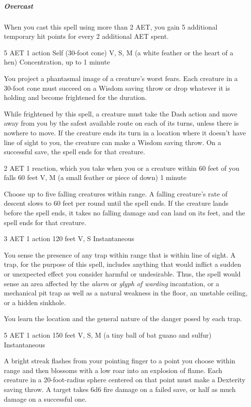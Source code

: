 \subparagraph*{Overcast} When you cast this spell using more than 2 AET, you gain 5 additional temporary hit points for every 2 additional AET spent.


{5 AET}
{1 action}
{Self (30-foot cone)}
{V, S, M (a white feather or the heart of a hen)}
{Concentration, up to 1 minute}

You project a phantasmal image of a creature's worst fears. Each creature in a 30-foot cone must succeed on a Wisdom saving throw or drop whatever it is holding and become frightened for the duration.

While frightened by this spell, a creature must take the Dash action and move away from you by the safest available route on each of its turns, unless there is nowhere to move. If the creature ends its turn in a location where it doesn't have line of sight to you, the creature can make a Wisdom saving throw. On a successful save, the spell ends for that creature.


{2 AET}
{1 reaction, which you take when you or a creature within 60 feet of you falls}
{60 feet}
{V, M (a small feather or piece of down)}
{1 minute}

Choose up to five falling creatures within range. A falling creature's rate of descent slows to 60 feet per round until the spell ends. If the creature lands before the spell ends, it takes no falling damage and can land on its feet, and the spell ends for that creature.


{3 AET}
{1 action}
{120 feet}
{V, S}
{Instantaneous}

You sense the presence of any trap within range that is within line of sight. A trap, for the purpose of this spell, includes anything that would inflict a sudden or unexpected effect you consider harmful or undesirable. Thus, the spell would sense an area affected by the \textit{alarm} or \textit{glyph of warding} incantation, or a mechanical pit trap as well as a natural weakness in the floor, an unstable ceiling, or a hidden sinkhole.

You learn the location and the general nature of the danger posed by each trap.


{5 AET}
{1 action}
{150 feet}
{V, S, M (a tiny ball of bat guano and sulfur)}
{Instantaneous}

A bright streak flashes from your pointing finger to a point you choose within range and then blossoms with a low roar into an explosion of flame. Each creature in a 20-foot-radius sphere centered on that point must make a Dexterity saving throw. A target takes 6d6 fire damage on a failed save, or half as much damage on a successful one.

